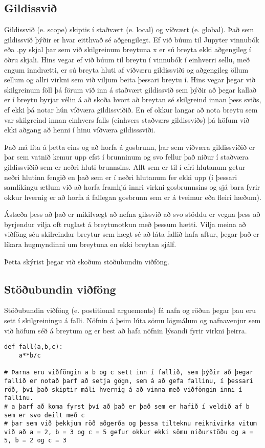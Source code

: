\subsection{Gildissvið}
Gildissvið (e. scope) skiptis í staðvært (e. local) og víðvært (e. global). 
Það sem gildissvið þýðir er hvar eitthvað sé aðgengilegt.
Ef við búum til Jupyter vinnubók eða .py skjal þar sem við skilgreinum breytuna x er sú breyta ekki aðgengileg í öðru skjali.
Hins vegar ef við búum til breytu í vinnubók í einhverri sellu, með engum inndrætti, er sú breyta hluti af viðværu gildissviði og aðgengileg öllum sellum og allri virkni sem við viljum beita þessari breytu í.
Hins vegar þegar við skilgreinum föll þá förum við inn á staðvært gildissvið sem þýðir að þegar kallað er í breytu byrjar vélin á að skoða hvort að breytan sé skilgreind innan þess sviðs, ef ekki þá notar hún víðværa gildissviðið.
En ef okkur langar að nota breytu sem var skilgreind innan einhvers falls (einhvers staðværs gildissviðs) þá höfum við ekki aðgang að henni í hinu víðværa gildisssviði.

Það má líta á þetta eins og að horfa á gosbrunn, þar sem víðværa gildissviðið er þar sem vatnið kemur upp efst í brunninum og svo fellur það niður í staðværa gildissviðið sem er neðri hluti brunnsins.
Allt sem er til í efri hlutanum getur neðri hlutinn fengið en það sem er í neðri hlutanum fer ekki upp (í þessari samlíkingu ætlum við að horfa framhjá innri virkni gosbrunnsins og sjá bara fyrir okkur hvernig er að horfa á fallegan gosbrunn sem er á tveimur eða fleiri hæðum).

Ástæða þess að það er mikilvægt að nefna gilssvið að svo stöddu er vegna þess að byrjendur vilja oft ruglast á breytunotkun með þessum hætti.
Vilja meina að viðföng séu skilreindar breytur sem hægt sé að láta fallið hafa aftur, þegar það er líkara hugmyndinni um breytuna en ekki breytan sjálf.

Þetta skýrist þegar við skoðum stöðubundin viðföng.

\subsection{Stöðubundin viðföng}
Stöðubundin viðföng (e. postitional arguements) fá nafn og röðun þegar þau eru sett í skilgreiningu á falli.
Nöfnin á þeim lúta sömu lögmálum og nafnavenjur sem við höfum séð á breytum og er best að hafa nöfnin lýsandi fyrir virkni þeirra.

\begin{lstlisting}[caption=Stöðubundin viðföng kynnt, label=lst:foll-stodubundin-kynning]
def fall(a,b,c):
	a**b/c
	
# Þarna eru viðföngin a b og c sett inn í fallið, sem þýðir að þegar fallið er notað þarf að setja gögn, sem á að gefa fallinu, í þessari röð, því það skiptir máli hvernig á að vinna með viðföngin inni í fallinu.
# a þarf að koma fyrst því að það er það sem er hafið í veldið af b sem er svo deilt með c
# þar sem við þekkjum röð aðgerða og þessa tilteknu reiknivirka vitum við að a = 2, b = 3 og c = 5 gefur okkur ekki sömu niðurstöðu og a = 5, b = 2 og c = 3
\end{lstlisting}

